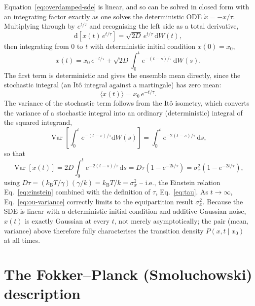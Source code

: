 \documentclass[11pt]{article}
\newcommand{\dd}{\mathrm{d}}
\newcommand{\avg}[1]{\langle #1 \rangle}
\newcommand{\kB}{k_{\mathrm{B}}}
\newcommand{\Var}{\operatorname{Var}}
\begin{document}
Equation~\eqref{eq:overdamped-sde} is linear, and so can be solved in closed form with an integrating factor exactly as one solves the deterministic ODE $\dot x = -x/\tau$. Multiplying through by $e^{t/\tau}$ and recognising the left side as a total derivative,
\begin{equation}
\dd\!\left[x(t)\,e^{t/\tau}\right] = \sqrt{2D}\,e^{t/\tau}\,\dd W(t),
\end{equation}
then integrating from $0$ to $t$ with deterministic initial condition $x(0)=x_0$,
\begin{equation}
x(t) = x_0\,e^{-t/\tau} + \sqrt{2D}\int_0^t e^{-(t-s)/\tau}\,\dd W(s).
\label{eq:ou-solution}
\end{equation}
The first term is deterministic and gives the ensemble mean directly, since the stochastic integral (an It\^o integral against a martingale) has zero mean:
\begin{equation}
\avg{x(t)} = x_0\,e^{-t/\tau}.
\label{eq:ou-mean}
\end{equation}
The variance of the stochastic term follows from the It\^o isometry, which converts the variance of a stochastic integral into an ordinary (deterministic) integral of the squared integrand,
\begin{equation}
\Var\!\left[\int_0^t e^{-(t-s)/\tau}\dd W(s)\right] = \int_0^t e^{-2(t-s)/\tau}\,\dd s,
\end{equation}
so that
\begin{equation}
\Var[x(t)] = 2D\int_0^t e^{-2(t-s)/\tau}\,\dd s
= D\tau\left(1-e^{-2t/\tau}\right)
= \sigma_x^2\left(1-e^{-2t/\tau}\right),
\label{eq:ou-variance}
\end{equation}
using $D\tau = (\kB T/\gamma)(\gamma/k) = \kB T/k = \sigma_x^2$ -- i.e., the Einstein relation Eq.~\eqref{eq:einstein} combined with the definition of $\tau$, Eq.~\eqref{eq:tau}. As $t\to\infty$, Eq.~\eqref{eq:ou-variance} correctly limits to the equipartition result $\sigma_x^2$. Because the SDE is linear with a deterministic initial condition and additive Gaussian noise, $x(t)$ is exactly Gaussian at every $t$, not merely asymptotically; the pair (mean, variance) above therefore fully characterises the transition density $P(x,t\mid x_0)$ at all times.

\section{The Fokker--Planck (Smoluchowski) description}
\label{sec:fp}
\end{document}
